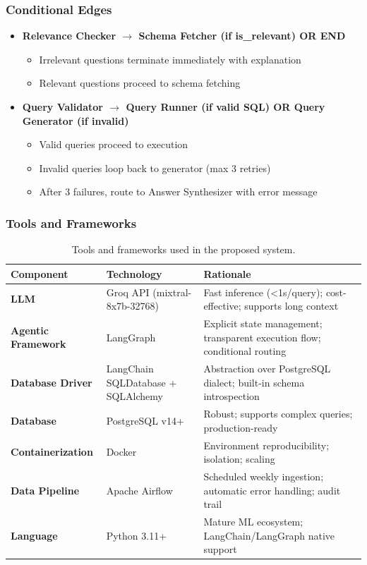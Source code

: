 \documentclass{article}
\begin{document}
\subsubsection{Conditional Edges}
\begin{itemize}
  \item \textbf{Relevance Checker $\rightarrow$ Schema Fetcher (if is\_relevant) OR END}
  \begin{itemize}
    \item Irrelevant questions terminate immediately with explanation
    \item Relevant questions proceed to schema fetching
  \end{itemize}
  \item \textbf{Query Validator $\rightarrow$ Query Runner (if valid SQL) OR Query Generator (if invalid)}
  \begin{itemize}
    \item Valid queries proceed to execution
    \item Invalid queries loop back to generator (max 3 retries)
    \item After 3 failures, route to Answer Synthesizer with error message
  \end{itemize}
\end{itemize}

\subsubsection{Tools and Frameworks}
\begin{table}[h]
\centering
\begin{tabularx}{\textwidth}{|l|X|X|}
\hline
\textbf{Component} & \textbf{Technology} & \textbf{Rationale} \\
\hline
\textbf{LLM} & Groq API (mixtral-8x7b-32768) & Fast inference (<1s/query); cost-effective; supports long context \\
\hline
\textbf{Agentic Framework} & LangGraph & Explicit state management; transparent execution flow; conditional routing \\
\hline
\textbf{Database Driver} & LangChain SQLDatabase + SQLAlchemy & Abstraction over PostgreSQL dialect; built-in schema introspection \\
\hline
\textbf{Database} & PostgreSQL v14+ & Robust; supports complex queries; production-ready \\
\hline
\textbf{Containerization} & Docker & Environment reproducibility; isolation; scaling \\
\hline
\textbf{Data Pipeline} & Apache Airflow & Scheduled weekly ingestion; automatic error handling; audit trail \\
\hline
\textbf{Language} & Python 3.11+ & Mature ML ecosystem; LangChain/LangGraph native support \\
\hline
\end{tabularx}
\caption{Tools and frameworks used in the proposed system.}
\label{tab:tools_frameworks}
\end{table}
\end{document}
